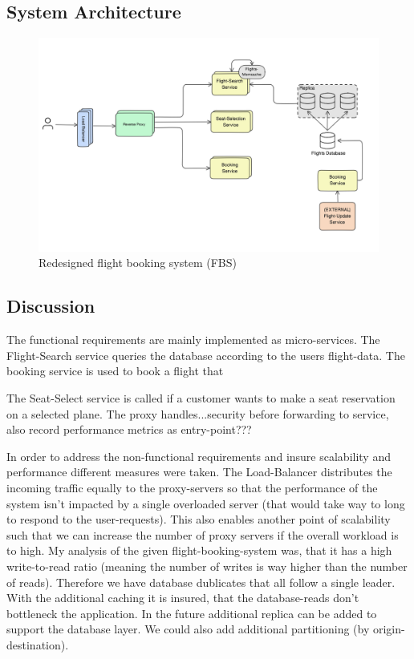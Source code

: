 \documentclass{article}
\begin{document}
\subsection{System Architecture}
\begin{figure}
    \centering
    \includegraphics[width=\linewidth]{1st_system_design_sketch.png}
    \caption{Redesigned flight booking system (FBS)}
    \label{fig:enter-label}
\end{figure}
\newpage 

\subsection{Discussion}
The functional requirements are mainly implemented as micro-services.
The Flight-Search service queries the database according to the users flight-data. The booking service is used to book a flight that 

The Seat-Select service is called if a customer wants to make a seat reservation on a selected plane. 
The proxy handles...security before forwarding to service, also record performance metrics as entry-point???

In order to address the non-functional requirements and insure scalability and performance different measures were taken. 
The Load-Balancer distributes the incoming traffic equally to the proxy-servers so that the performance of the system isn't impacted by a single overloaded server (that would take way to long to respond to the user-requests). This also enables another point of scalability such that we can increase the number of proxy servers if the overall workload is to high.
My analysis of the given flight-booking-system was, that it has a high write-to-read ratio (meaning the number of writes is way higher than the number of reads). Therefore we have database dublicates that all follow a single leader. With the additional caching it is insured, that the database-reads don't bottleneck the application. In the future additional replica can be added to support the database layer. We could also add additional partitioning (by origin-destination). 
\end{document}

